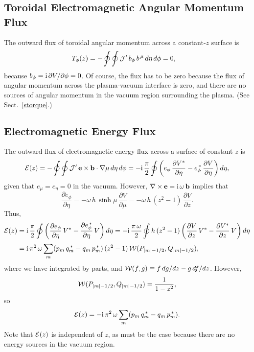 \documentclass[12pt,prb,aps]{revtex4-1}
\begin{document}
\subsection{Toroidal Electromagnetic Angular Momentum Flux}
The outward flux of toroidal angular momentum across a constant-$z$ surface is\,\cite{tj,tj1}
\begin{align}
T_\phi(z) &= -\oint\oint {\cal J}' \,b_\phi\,b^{\,\mu}\,d\eta\,d\phi = 0,
\end{align}
because $b_\phi = {\rm i}\,\partial V/\partial\phi = 0$. Of course, the flux has to be zero because the flux of angular momentum across the plasma-vacuum
interface is zero, and there are no sources of angular momentum in the vacuum region surrounding the plasma. (See Sect.~\ref{storque}.)

\subsection{Electromagnetic Energy Flux}
The outward flux of electromagnetic energy flux across a  surface of constant $z$ is
\begin{align}
{\cal E}(z) = -\oint\oint {\cal J}'\,{\bf e}\times {\bf b}\cdot\nabla \mu\,d\eta\,d\phi= -{\rm i}\,
\frac{\pi}{2}\oint\left(e_\phi\,\frac{\partial V^\ast}{\partial\eta}
- e_\phi^{\,\ast}\,\frac{\partial V}{\partial\eta}\right)d\eta,
\end{align}
given that $e_\mu=e_\eta=0$ in the vacuum. 
However, $\nabla\times{\bf e}= {\rm i}\,\omega\,{\bf b}$ implies that
\begin{equation}
\frac{\partial e_\phi}{\partial\eta} = - \omega\,h\,\sinh\mu\,\frac{\partial V}{\partial \mu}= - \omega\,h\,(z^2-1)\,\frac{\partial V}{\partial z}. 
\end{equation}
Thus,
\begin{align}
{\cal E}(z) &= {\rm i}\,\frac{\pi}{2}\oint\left(\frac{\partial e_\phi}{\partial\eta}\,V^\ast - \frac{\partial e_\phi^{\,\ast}}{\partial\eta}\,V\right)d\eta= 
-{\rm i}\,\frac{\pi\,\omega}{2}\oint h\,(z^2-1)\left(\frac{\partial V}{\partial z}\,V^\ast - \frac{\partial V^\ast}{\partial z}\,V\right) d\eta\nonumber\\[0.5ex]
&= {\rm i}\,\pi^2\,\omega\sum_m(p_m\,q_m^{\,\ast}-q_m\,p_m^{\,\ast})\,(z^2-1)\,{\cal W}(P_{|m|-1/2},Q_{|m|-1/2}),
 \end{align}
 where we have integrated by parts, and ${\cal W}(f,g)\equiv f\,dg/dz-g\,df/dz$. However,\cite{mf2}
 \begin{equation}
 {\cal W}(P_{|m|-1/2},Q_{|m|-1/2}) = \frac{1}{1-z^2},
 \end{equation}
 so
 \begin{equation}\label{e168g}
 {\cal E}(z)=- {\rm i}\,\pi^2\,\omega\sum_m(p_m\,q_m^{\,\ast}-q_m\,p_m^{\,\ast}).
 \end{equation}
 Note that ${\cal E}(z)$ is independent of $z$, as must be the case because there are no energy sources in the vacuum region. 
\end{document}
